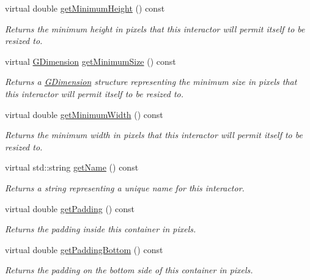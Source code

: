 \begin{DoxyCompactItemize}
virtual double \mbox{\hyperlink{classGInteractor_aed4b0075fcc434499c3cb3e46896bda3}{get\+Minimum\+Height}} () const
\begin{DoxyCompactList}\small\item\em Returns the minimum height in pixels that this interactor will permit itself to be resized to. \end{DoxyCompactList}\item 
virtual \mbox{\hyperlink{classGDimension}{G\+Dimension}} \mbox{\hyperlink{classGInteractor_a66b5af0b32493b4d597ca0a3df2049ea}{get\+Minimum\+Size}} () const
\begin{DoxyCompactList}\small\item\em Returns a \mbox{\hyperlink{classGDimension}{G\+Dimension}} structure representing the minimum size in pixels that this interactor will permit itself to be resized to. \end{DoxyCompactList}\item 
virtual double \mbox{\hyperlink{classGInteractor_a59e668114fe3d49d2a0f28deb258f7c8}{get\+Minimum\+Width}} () const
\begin{DoxyCompactList}\small\item\em Returns the minimum width in pixels that this interactor will permit itself to be resized to. \end{DoxyCompactList}\item 
virtual std\+::string \mbox{\hyperlink{classGInteractor_a8a60438a5b55d0b2ceb35c8674b9d8c5}{get\+Name}} () const
\begin{DoxyCompactList}\small\item\em Returns a string representing a unique name for this interactor. \end{DoxyCompactList}\item 
virtual double \mbox{\hyperlink{classGContainer_a19fdf4f4500aead343992102066983cb}{get\+Padding}} () const
\begin{DoxyCompactList}\small\item\em Returns the padding inside this container in pixels. \end{DoxyCompactList}\item 
virtual double \mbox{\hyperlink{classGContainer_a5696e2debbbafb717c0d47e069b896e4}{get\+Padding\+Bottom}} () const
\begin{DoxyCompactList}\small\item\em Returns the padding on the bottom side of this container in pixels. \end{DoxyCompactList}\item 

\end{DoxyCompactItemize}
